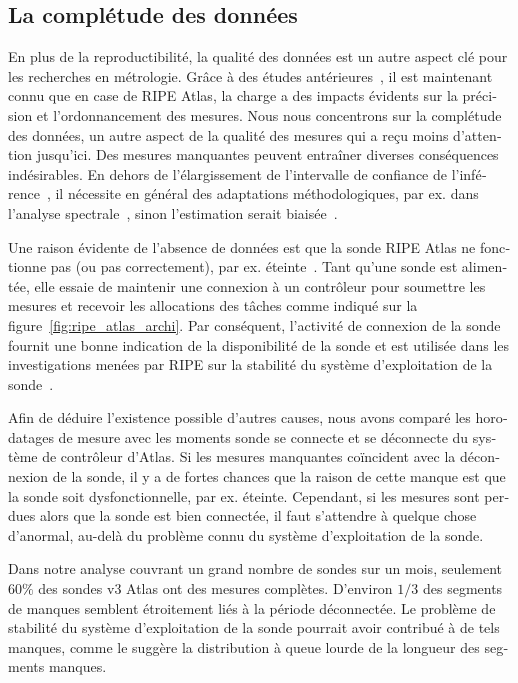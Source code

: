 \begin{otherlanguage}{french}
\subsection*{La complétude des données}

En plus de la reproductibilité, la qualité des données est un autre aspect clé pour les recherches en métrologie.
Grâce à des études antérieures~\cite{Holterbach2015a, Bajpai2015}, il est maintenant connu que en case de RIPE Atlas, la charge a des impacts évidents sur la précision et l'ordonnancement des mesures.
Nous nous concentrons sur la complétude des données, un autre aspect de la qualité des mesures qui a reçu moins d'attention jusqu'ici. 
Des mesures manquantes peuvent entraîner diverses conséquences indésirables.
En dehors de l'élargissement de l'intervalle de confiance de l'inférence~\cite{Fontugne2016}, 
il nécessite en général des adaptations méthodologiques, par ex. dans l'analyse spectrale~\cite{Babu2010, Luckie2014, shao2016}, 
sinon l'estimation serait biaisée~\cite {Baraldi2010}.

Une raison évidente de l'absence de données est que la sonde RIPE Atlas ne fonctionne pas (ou pas correctement), par ex. éteinte~\cite{schedule}.
Tant qu'une sonde est alimentée, elle essaie de maintenir une connexion à un contrôleur pour soumettre les mesures et recevoir les allocations des tâches comme indiqué sur la figure~\ref{fig:ripe_atlas_archi}.
Par conséquent, l'activité de connexion de la sonde fournit une bonne indication de la disponibilité de la sonde et est utilisée dans les investigations menées par RIPE sur la stabilité du système d'exploitation de la sonde~\cite{1look, 2look, 3look}.

Afin de déduire l'existence possible d'autres causes, nous avons comparé les horodatages de mesure avec les moments sonde se connecte et se déconnecte du système de contrôleur d'Atlas.
Si les mesures manquantes coïncident avec la déconnexion de la sonde, il y a de fortes chances que la raison de cette manque est que la sonde soit dysfonctionnelle, par ex. éteinte.
Cependant, si les mesures sont perdues alors que la sonde est bien connectée, il faut s'attendre à quelque chose d'anormal, au-delà du problème connu du système d'exploitation de la sonde.

Dans notre analyse couvrant un grand nombre de sondes sur un mois, seulement $60\%$ des sondes v3 Atlas ont des mesures complètes. 
D'environ $1/3$ des segments de manques semblent étroitement liés à la période déconnectée. 
Le problème de stabilité du système d'exploitation de la sonde pourrait avoir contribué à de tels manques, 
comme le suggère la distribution à queue lourde de la longueur des segments manques.


\end{otherlanguage}
